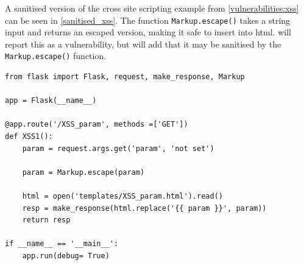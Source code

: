 A sanitised version of the cross site scripting example from \cref{vulnerabilities:xss} can be seen in \cref{sanitised_xss}.
The function \texttt{Markup.escape()} takes a string input and returns an escaped version, making it safe to insert into html.
\pyt will report this as a vulnerability, but will add that it may be sanitised by the \texttt{Markup.escape()} function.

\begin{lstlisting}[style=python, caption={The cross site scripting example sanitised by the escape function}, label={sanitised_xss}]
from flask import Flask, request, make_response, Markup

app = Flask(__name__)

@app.route('/XSS_param', methods =['GET'])
def XSS1():
    param = request.args.get('param', 'not set')

    param = Markup.escape(param)

    html = open('templates/XSS_param.html').read()
    resp = make_response(html.replace('{{ param }}', param))
    return resp

if __name__ == '__main__':
    app.run(debug= True)  
\end{lstlisting}
